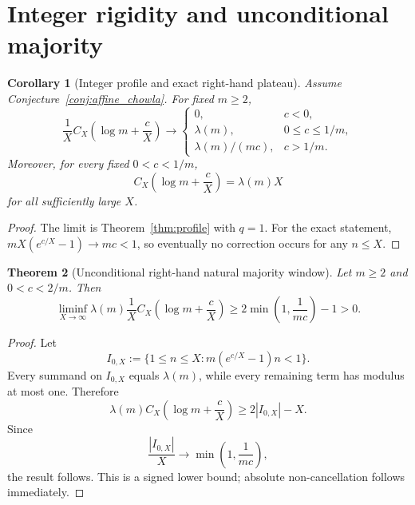 \documentclass[preprint,12pt]{elsarticle}
\numberwithin{equation}{section}
\theoremstyle{plain}
\newtheorem{theorem}{Theorem}[section]
\newtheorem{corollary}[theorem]{Corollary}
\theoremstyle{definition}
\theoremstyle{remark}
\begin{document}
\section{Integer rigidity and unconditional majority}
\label{sec:integer}

\begin{corollary}[Integer profile and exact right-hand plateau]
\label{cor:integer}
Assume Conjecture~\ref{conj:affine_chowla}. For fixed $m\ge2$,
\[
\frac1X C_X\!\left(\log m+\frac cX\right)
\longrightarrow
\begin{cases}
0,&c<0,\\
\lambda(m),&0\le c\le1/m,\\
\lambda(m)/(mc),&c>1/m.
\end{cases}
\]
Moreover, for every fixed $0<c<1/m$,
\[
C_X\!\left(\log m+\frac cX\right)=\lambda(m)X
\]
for all sufficiently large $X$.
\end{corollary}

\begin{proof}
The limit is Theorem~\ref{thm:profile} with $q=1$. For the exact statement,
$mX(e^{c/X}-1)\to mc<1$, so eventually no correction occurs for any
$n\le X$.
\end{proof}

\begin{theorem}[Unconditional right-hand natural majority window]
\label{thm:naturalmajority}
Let $m\ge2$ and $0<c<2/m$. Then
\begin{equation}
\liminf_{X\to\infty}
\lambda(m)\frac1X
C_X\!\left(\log m+\frac cX\right)
\ge
2\min\!\left(1,\frac1{mc}\right)-1>0.
\label{eq:naturalmajority}
\end{equation}
\end{theorem}

\begin{proof}
Let
\[
I_{0,X}:=\{1\le n\le X:m(e^{c/X}-1)n<1\}.
\]
Every summand on $I_{0,X}$ equals $\lambda(m)$, while every remaining term
has modulus at most one. Therefore
\[
\lambda(m)C_X\!\left(\log m+\frac cX\right)\ge2|I_{0,X}|-X.
\]
Since
\[
\frac{|I_{0,X}|}{X}\to\min\!\left(1,\frac1{mc}\right),
\]
the result follows. This is a signed lower bound; absolute
non-cancellation follows immediately.
\end{proof}
\end{document}
